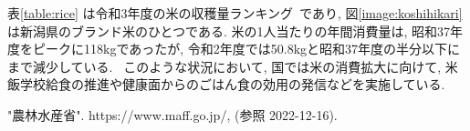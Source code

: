 \documentclass[a4j, titlepage]{jarticle}
\begin{document}
  表\ref{table:rice} は令和3年度の米の収穫量ランキング~\cite{Rice01}であり, 図\ref{image:koshihikari} は新潟県のブランド米のひとつである.
  米の1人当たりの年間消費量は, 昭和37年度をピークに118kgであったが, 令和2年度では50.8kgと昭和37年度の半分以下にまで減少している.~\cite{Rice01}
  このような状況において, 国では米の消費拡大に向けて, 米飯学校給食の推進や健康面からのごはん食の効用の発信などを実施している.
  \begin{thebibliography}{99}
    "農林水産省". https://www.maff.go.jp/, (参照 2022-12-16).
  \end{thebibliography}
\end{document}
